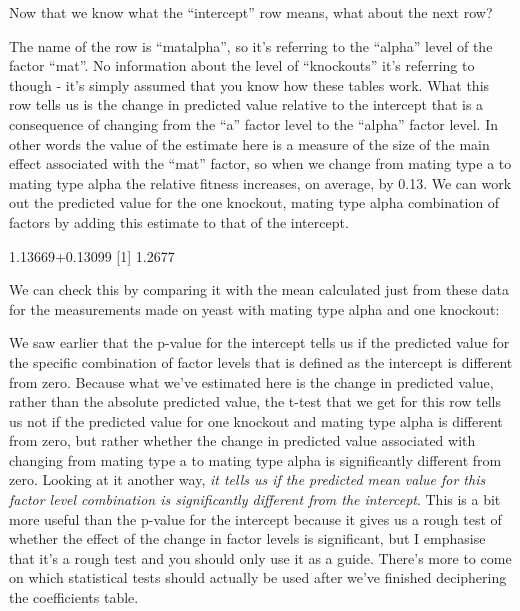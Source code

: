 \documentclass[
]{book}
\newenvironment{Shaded}{\begin{snugshade}}{\end{snugshade}}
\newcommand{\DecValTok}[1]{\textcolor[rgb]{0.00,0.00,0.81}{#1}}
\newcommand{\FloatTok}[1]{\textcolor[rgb]{0.00,0.00,0.81}{#1}}
\newcommand{\KeywordTok}[1]{\textcolor[rgb]{0.13,0.29,0.53}{\textbf{#1}}}
\newcommand{\NormalTok}[1]{#1}
\newcommand{\OperatorTok}[1]{\textcolor[rgb]{0.81,0.36,0.00}{\textbf{#1}}}
\newcommand{\StringTok}[1]{\textcolor[rgb]{0.31,0.60,0.02}{#1}}
\begin{document}
Now that we know what the ``intercept'' row means, what about the next row?

The name of the row is ``matalpha'', so it's referring to the ``alpha'' level of the factor ``mat''. No information about the level of ``knockouts'' it's referring to though - it's simply assumed that you know how these tables work. What this row tells us is the change in predicted value relative to the intercept that is a consequence of changing from the ``a'' factor level to the ``alpha'' factor level. In other words the value of the estimate here is a measure of the size of the main effect associated with the ``mat'' factor, so when we change from mating type a to mating type alpha the relative fitness increases, on average, by 0.13. We can work out the predicted value for the one knockout, mating type alpha combination of factors by adding this estimate to that of the intercept.

\begin{Shaded}
\begin{Highlighting}[]
\FloatTok{1.13669+0.13099}
\NormalTok{[}\DecValTok{1}\NormalTok{] }\FloatTok{1.2677}
\end{Highlighting}
\end{Shaded}

We can check this by comparing it with the mean calculated just from these data for the measurements made on yeast with mating type alpha and one knockout:

\begin{Shaded}
\end{Shaded}

We saw earlier that the p-value for the intercept tells us if the predicted value for the specific combination of factor levels that is defined as the intercept is different from zero. Because what we've estimated here is the change in predicted value, rather than the absolute predicted value, the t-test that we get for this row tells us not if the predicted value for one knockout and mating type alpha is different from zero, but rather whether the change in predicted value associated with changing from mating type a to mating type alpha is significantly different from zero. Looking at it another way, \emph{it tells us if the predicted mean value for this factor level combination is significantly different from the intercept}. This is a bit more useful than the p-value for the intercept because it gives us a rough test of whether the effect of the change in factor levels is significant, but I emphasise that it's a rough test and you should only use it as a guide. There's more to come on which statistical tests should actually be used after we've finished deciphering the coefficients table.
\end{document}
